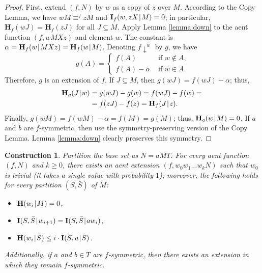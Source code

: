 \documentclass[a4paper]{IEEEtran}
\def\|{\mskip1.5mu{|}\mskip1.5mu}
\def\H{\mathbf H}
\def\I{\mathbf I}
\newcommand\dn{{\downarrow}}
\newtheorem{construction}{Construction}
\theoremstyle{definition}
\begin{document}
\begin{proof}
First, extend $(f,N)$ by $w$ as a copy of $z$ over $M$. According to the
Copy Lemma, we have $wM\equiv^f zM$ and $\I_f(w,zX\|M)=0$; in
particular, $\H_f(wJ)=\H_f(zJ) \mbox{ for all } J\subseteq M$. Apply Lemma
\ref{lemma:down} to the aent function $(f,wMXz)$ and element $w$. The
constant is $\alpha=\H_f(w\|MXz)=\H_f(w\|M)$. Denoting $f\dn^w$ by $g$,
we have
$$
   g(A) = \begin{cases}
      f(A) & \mbox{ if $w\notin A$}, \\
      f(A)-\alpha & \mbox{ if $w\in A$}.
   \end{cases}
$$
Therefore, $g$ is an extension of $f$. If $J\subseteq M$, then
$g(wJ)=f(wJ)-\alpha$; thus,
\begin{align*}
   \H_g(J\|w)&=g(wJ)-g(w) = f(wJ)-f(w)={}\\
             &=f(zJ)-f(z)=\H_f(J\|z).
\end{align*}
Finally, $g(wM)=f(wM)-\alpha=f(M)=g(M)$; thus, $\H_g(w\|M)=0$.
If $a$ and $b$ are $f$-symmetric, then use the symmetry-preserving version
of the Copy Lemma. Lemma \ref{lemma:down} clearly preserves this symmetry.
\end{proof}

\begin{construction}\label{lemma:Dw}
Partition the base set as $N=aMT$. For every aent function $(f,N)$ and $k\ge
0$, there exists an aent extension $(f,w_0w_1\dots w_kN)$ such that $w_0$ is
trivial (it takes a single value with probability $1$); moreover, the
following holds for every partition $(S,\bar S)$ of $M$:
\begin{itemize}
\item[a)] $\H(w_i\|M)=0$,
\item[b)] $\I(S,\bar S\|w_{i+1}) = \I(S,\bar S\|aw_i)$,
\item[c)] $\H(w_i\|S)\le i\cdot\I(\bar S,a\|S)$.
\end{itemize}
Additionally, if $a$ and $b\in T$ are $f$-symmetric, then there exists an
extension in which they remain $f$-symmetric.
\end{construction}
\end{document}
